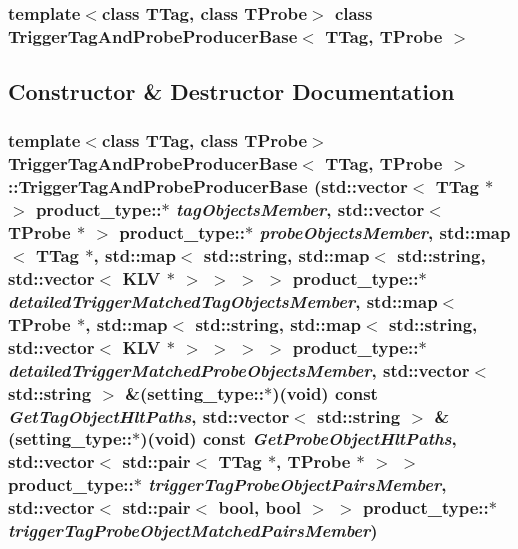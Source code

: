 \subsubsection*{template$<$class TTag, class TProbe$>$ class TriggerTagAndProbeProducerBase$<$ TTag, TProbe $>$}



\subsection{Constructor \& Destructor Documentation}
\hypertarget{classTriggerTagAndProbeProducerBase_a26dbb7f3ee7adb10446ef47905099e47}{
\subsubsection[{TriggerTagAndProbeProducerBase}]{\setlength{\rightskip}{0pt plus 5cm}template$<$class TTag, class TProbe$>$ {\bf TriggerTagAndProbeProducerBase}$<$ TTag, TProbe $>$::{\bf TriggerTagAndProbeProducerBase} (std::vector$<$ TTag $\ast$ $>$ product\_\-type::$\ast$ {\em tagObjectsMember}, \/  std::vector$<$ TProbe $\ast$ $>$ product\_\-type::$\ast$ {\em probeObjectsMember}, \/  std::map$<$ TTag $\ast$, std::map$<$ std::string, std::map$<$ std::string, std::vector$<$ KLV $\ast$ $>$ $>$ $>$ $>$ product\_\-type::$\ast$ {\em detailedTriggerMatchedTagObjectsMember}, \/  std::map$<$ TProbe $\ast$, std::map$<$ std::string, std::map$<$ std::string, std::vector$<$ KLV $\ast$ $>$ $>$ $>$ $>$ product\_\-type::$\ast$ {\em detailedTriggerMatchedProbeObjectsMember}, \/  std::vector$<$ std::string $>$ \&(setting\_\-type::$\ast$)(void) const  {\em GetTagObjectHltPaths}, \/  std::vector$<$ std::string $>$ \&(setting\_\-type::$\ast$)(void) const  {\em GetProbeObjectHltPaths}, \/  std::vector$<$ std::pair$<$ TTag $\ast$, TProbe $\ast$ $>$ $>$ product\_\-type::$\ast$ {\em triggerTagProbeObjectPairsMember}, \/  std::vector$<$ std::pair$<$ bool, bool $>$ $>$ product\_\-type::$\ast$ {\em triggerTagProbeObjectMatchedPairsMember})}}
\label{classTriggerTagAndProbeProducerBase_a26dbb7f3ee7adb10446ef47905099e47}


